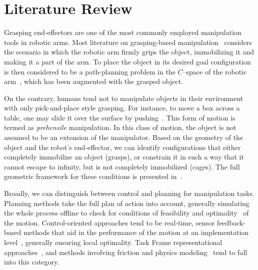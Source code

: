 \documentclass[runningheads,letterpaper]{llncs}
\begin{document}


\section{Literature Review} \label{sec:lit_review}
Grasping end-effectors are one of the most commonly employed manipulation tools in robotic arms. Most literature on grasping-based manipulation~\cite{prattichizzo2016grasping} considers the scenario in which the robotic arm firmly grips the object, immobilizing it and making it a part of the arm. To place the object in its desired goal configuration is then considered to be a path-planning problem in the $C$--space of the robotic arm~\cite{brock2008motion}, which has been augmented with the grasped object. 

On the contrary, humans tend not to manipulate objects in their environment with only pick-and-place style grasping. For instance, to move a box across a table, one may slide it over the surface by pushing~\cite{chavan2015prehensile}. This form of motion is termed as \textit{prehensile} manipulation. In this class of motion, the object is not assumed to be an extension of the manipulator. Based on the geometry of the object and the robot's end-effector, we can identify configurations that either completely immobilize an object (grasps), or constrain it in such a way that it cannot escape to infinity, but is not completely immobilized (cages). The full geometric framework for these conditions is presented in~\cite{rodriguez2012caging}.

Broadly, we can distinguish between control and planning for manipulation tasks. Planning methods take the full plan of action into account, generally simulating the whole process offline to check for conditions of feasibility and optimality~\cite{kavraki2016motion} of the motion. Control-oriented approaches tend to be real-time, sensor feedback-based methods that aid in the performance of the motion at an implementation level~\cite{dafle2014extrinsic}, generally ensuring local optimality. Task Frame representational approaches~\cite{prats2010framework}, and methods involving friction and physics modeling~\cite{chavan2015prehensile} tend to fall into this category.
\end{document}
